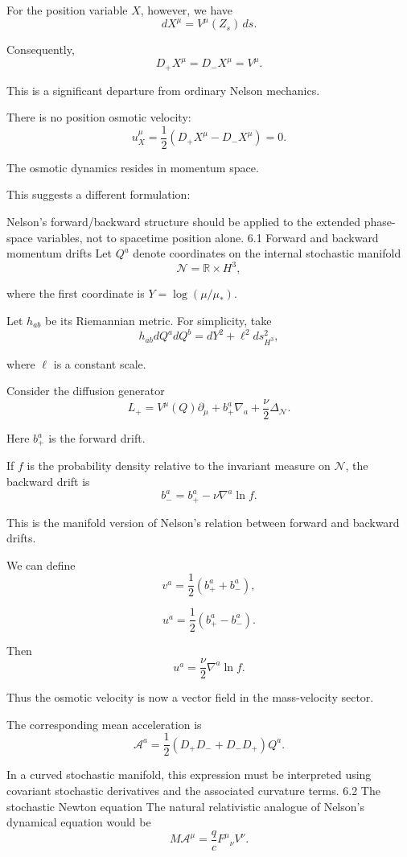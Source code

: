 For the position variable \(X\), however, we have
\[
dX^\mu=V^\mu(Z_s)\,ds.
\]

Consequently,
\[
D_+X^\mu=D_-X^\mu=V^\mu.
\tag{14}
\]

This is a significant departure from ordinary Nelson mechanics.

There is no position osmotic velocity:
\[
u_X^\mu
=
\frac12(D_+X^\mu-D_-X^\mu)=0.
\]

The osmotic dynamics resides in momentum space.

This suggests a different formulation:

Nelson's forward/backward structure should be applied to the extended phase-space variables, not to spacetime position alone.
6.1 Forward and backward momentum drifts
Let \(Q^a\) denote coordinates on the internal stochastic manifold
\[
\mathcal N=\mathbb R\times H^3,
\]

where the first coordinate is \(Y=\log(\mu/\mu_*)\).

Let \(h_{ab}\) be its Riemannian metric. For simplicity, take
\[
h_{ab}dQ^a dQ^b
=
dY^2+\ell^2 ds_{H^3}^2,
\]

where \(\ell\) is a constant scale.

Consider the diffusion generator
\[
L_+
=
V^\mu(Q)\partial_\mu
+b_+^a\nabla_a
+\frac{\nu}{2}\Delta_{\mathcal N}.
\tag{15}
\]

Here \(b_+^a\) is the forward drift.

If \(f\) is the probability density relative to the invariant measure on \(\mathcal N\), the backward drift is
\[
\boxed{
b_-^a
=
b_+^a-\nu\nabla^a\ln f.
}
\tag{16}
\]

This is the manifold version of Nelson's relation between forward and backward drifts.

We can define
\[
v^a=\frac12(b_+^a+b_-^a),
\]

\[
u^a=\frac12(b_+^a-b_-^a).
\]

Then
\[
\boxed{
u^a=\frac{\nu}{2}\nabla^a\ln f.
}
\tag{17}
\]

Thus the osmotic velocity is now a vector field in the mass-velocity sector.

The corresponding mean acceleration is
\[
\mathcal A^a
=
\frac12(D_+D_-+D_-D_+)Q^a.
\tag{18}
\]

In a curved stochastic manifold, this expression must be interpreted using covariant stochastic derivatives and the associated curvature terms.
6.2 The stochastic Newton equation
The natural relativistic analogue of Nelson's dynamical equation would be
\[
\boxed{
M\mathcal A^\mu
=
\frac qc F^\mu{}_\nu V^\nu.
}
\tag{19}
\]

